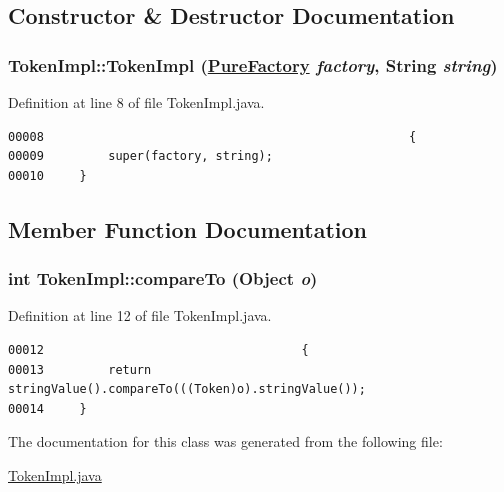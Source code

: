 \subsection{Constructor \& Destructor Documentation}
\hypertarget{classTokenImpl_c0}{
\subsubsection[TokenImpl]{\setlength{\rightskip}{0pt plus 5cm}Token\-Impl::Token\-Impl (\hyperlink{classPureFactory}{Pure\-Factory} {\em factory}, String {\em string})}}
\label{classTokenImpl_c0}




Definition at line 8 of file Token\-Impl.java.\footnotesize\begin{verbatim}00008                                                   {
00009         super(factory, string);
00010     }
\end{verbatim}\normalsize 


\subsection{Member Function Documentation}
\hypertarget{classTokenImpl_a0}{
\subsubsection[compareTo]{\setlength{\rightskip}{0pt plus 5cm}int Token\-Impl::compare\-To (Object {\em o})}}
\label{classTokenImpl_a0}




Definition at line 12 of file Token\-Impl.java.\footnotesize\begin{verbatim}00012                                    {
00013         return stringValue().compareTo(((Token)o).stringValue());
00014     }
\end{verbatim}\normalsize 


The documentation for this class was generated from the following file:\begin{CompactItemize}
\item 
\hyperlink{TokenImpl_8java-source}{Token\-Impl.java}\end{CompactItemize}
